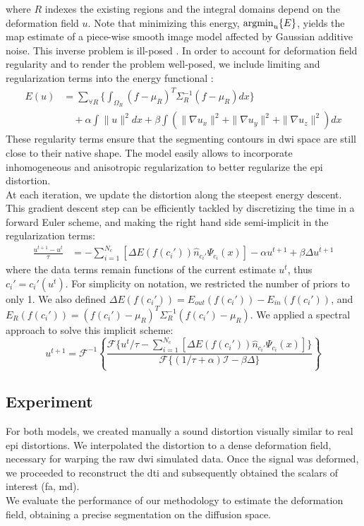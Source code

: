 where $R$ indexes the existing regions and the integral domains
depend on the deformation field $u$. Note
that minimizing this energy, $\operatorname{argmin}_u\{E\}$, yields the \ac{map} 
estimate of a piece-wise smooth image model affected by Gaussian 
additive noise. This inverse problem is ill-posed
\cite{bertero_ill-posed_1988,hadamard_sur_1902}.
In order to account for deformation field regularity and to render the 
problem well-posed, we include limiting and regularization terms into 
the energy functional \cite{morozov_linear_1975,tichonov_solution_1963}:
%
\begin{align}
\label{eq:complete_energy}
E(u) &= \sum_{\forall{R}} \lbrace \int_{\Omega_R} (f-\mu_R)^T\Sigma_R^{-1}(f-\mu_R) dx \rbrace \nonumber \\
&\quad + \alpha \int  \|u\|^2 dx + \beta \int \left( \|\nabla u_x\|^2 + \|\nabla u_y\|^2 + \|\nabla u_z\|^2\right) dx
\end{align}
%
These regularity terms ensure that the segmenting contours in 
\ac{dwi} space are still close to their native shape. The model
easily allows to incorporate inhomogeneous and anisotropic 
regularization \cite{nagel_investigation_1986} to better regularize
the \ac{epi} distortion. \\
%

At each iteration, we update the distortion along the steepest 
energy descent. This gradient descent step can be efficiently 
tackled by discretizing the time in a forward Euler scheme, 
and making the right hand side semi-implicit in the 
regularization terms:
%
\begin{align}
\frac{u^{t+1}-u^t}{\tau} &= - \sum_{i=1}^{N_c} \left[ \Delta E(f(c_i'))  \hat{n}_{c_i'} \Psi_{c_i}(x) \right] -\alpha u^{t+1} + \beta\Delta u^{t+1}
\end{align}
%
where the data terms remain functions of the current estimate 
$u^t$, thus $c_i' = c_i'(u^t)$. For simplicity on notation, we 
restricted the number of priors to only 1. We also defined 
$\Delta E(f(c_i')) = E_{out}(f(c_i')) - E_{in}(f(c_i'))$, 
and $E_R(f(c_i')) = (f(c_i')-\mu_R)^T\Sigma_R^{-1}(f(c_i')-\mu_R)$.
We applied a spectral approach to solve this implicit scheme:
%
\begin{equation}
u^{t+1} = \mathcal{F}^{-1}\left\{ \frac{\mathcal{F}\{u^t/\tau
- \sum_{i=1}^{N_c} \left[ \Delta E(f(c_i')) \hat{n}_{c_i'} \Psi_{c_i}(x) \right]  \}}{\mathcal{F}\{(1/\tau+\alpha)\mathcal{I}-\beta\Delta\}} \right\}
\end{equation}
%

\subsection{Experiment}
%
For both models, we created manually a sound distortion visually similar
to real \ac{epi} distortions. We interpolated the distortion to a 
dense deformation field, necessary for warping the raw \ac{dwi} simulated
data. Once the signal was deformed, we proceeded to reconstruct the
\ac{dti} and subsequently obtained the scalars of interest (\ac{fa}, \ac{md}).\\

We evaluate the performance of our methodology to estimate the deformation
field, obtaining a precise segmentation on the diffusion space.
